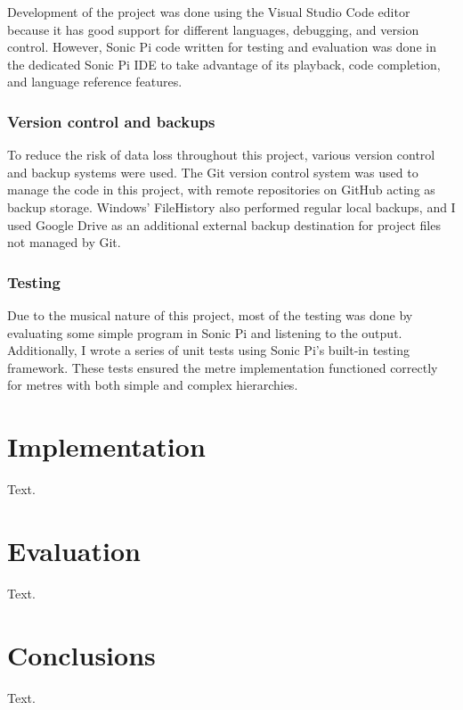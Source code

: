 \documentclass[12pt,twoside,openright]{report}
\begin{document}
Development of the project was done using the Visual Studio Code editor because
it has good support for different languages, debugging, and version control.
However, Sonic Pi code written for testing and evaluation was done in the
dedicated Sonic Pi IDE to take advantage of its playback, code completion, and
language reference features.


\subsection{Version control and backups}

To reduce the risk of data loss throughout this project, various version control
and backup systems were used. The Git version control system was used to manage
the code in this project, with remote repositories on GitHub acting as backup
storage. Windows' FileHistory also performed regular local backups, and I used
Google Drive as an additional external backup destination for project files not
managed by Git.


\subsection{Testing}

Due to the musical nature of this project, most of the testing was done by
evaluating some simple program in Sonic Pi and listening to the output.
Additionally, I wrote a series of unit tests using Sonic Pi's built-in testing
framework. These tests ensured the metre implementation functioned correctly for
metres with both simple and complex hierarchies.




\chapter{Implementation} \label{implementation}

Text.



\chapter{Evaluation} \label{evaluation}

Text.



\chapter{Conclusions} \label{conclusions}

Text.




\printbibliography[title=References]
\end{document}
